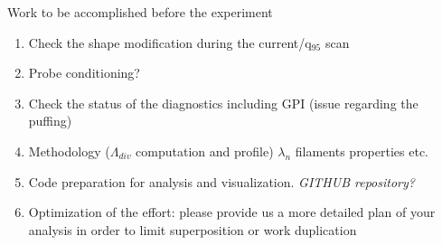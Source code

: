\documentclass[10pt, compress]{beamer}
\begin{document}
\begin{frame}{Work to be accomplished before the experiment}
  \begin{enumerate}
    \item Check the shape modification during the current/q$_{95}$
      scan
    \item Probe conditioning?
    \item Check the status of the diagnostics including GPI (issue
      regarding the puffing)
    \item Methodology ($\Lambda_{div}$ computation and profile)
      $\lambda_n$ filaments properties etc.  
    \item Code preparation for analysis and
      visualization. \emph{GITHUB repository?}
    \item Optimization of the effort: please provide us a more
      detailed plan of your analysis in order to limit superposition
      or work duplication
  \end{enumerate}
\end{frame}
\end{document}
